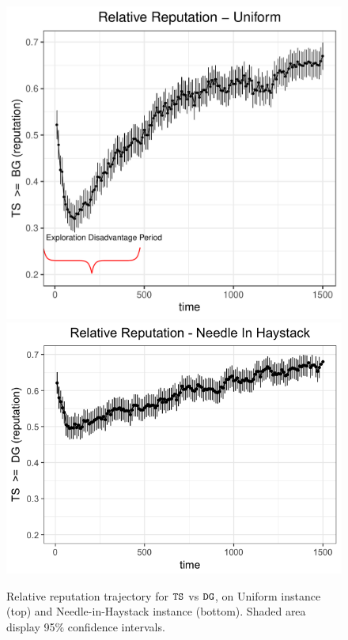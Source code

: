 \documentclass[../competing_bandits.tex]{subfiles}
\begin{document}
\begin{figure}[ht]
\includegraphics[scale=0.35]{ec19paper/figures/relative_uniform_annotated_plot}
\includegraphics[scale=0.35]{ec19paper/figures/relative_nih_ts_dg.png}
\caption{Relative reputation trajectory for $\mathtt{TS}$ vs $\mathtt{DG}$, on Uniform instance (top) and Needle-in-Haystack instance (bottom). Shaded area display 95\% confidence intervals.}
\label{relative_rep_plots}
\end{figure}
\end{document}
